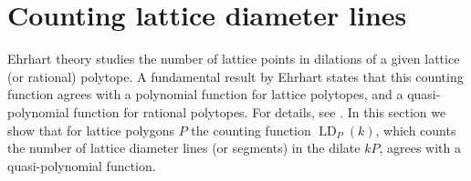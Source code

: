 \documentclass[11pt]{article}
\newcommand{\bp}{\mathbf{p}}
\newcommand{\Z}{\mathbb{Z}}
\DeclareMathOperator{\LD}{LD}
\begin{document}


\section{Counting lattice diameter lines}\label{sec:QP}

Ehrhart theory studies the number of lattice points in dilations of a given lattice (or rational) polytope. A fundamental result by Ehrhart states that this counting function agrees with a polynomial function for lattice polytopes, and a quasi-polynomial function for rational polytopes. For details, see \cite{beckrobins}. In this section we show that for lattice polygons $P$ the counting function $\LD_P(k)$, which counts the number of lattice diameter lines (or segments) in the dilate $kP$, agrees with a quasi-polynomial function.
\end{document}
